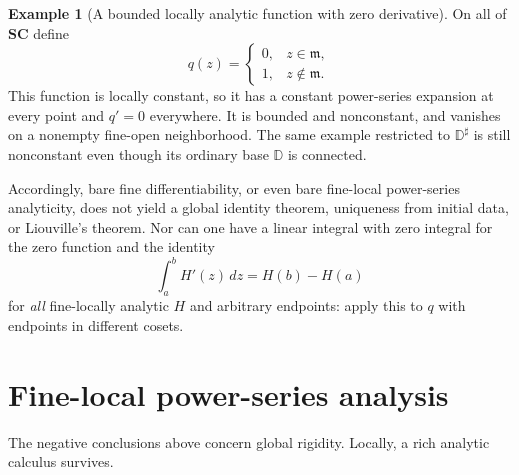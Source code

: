 \documentclass[11pt,letterpaper]{article}
\theoremstyle{definition}
\newtheorem{example}[theorem]{Example}
\theoremstyle{remark}
\newcommand{\SC}{\mathbf{SC}}
\newcommand{\mm}{\mathfrak m}
\newcommand{\DD}{\mathbb D}
\newcommand{\sh}{^{\sharp}}
\numberwithin{equation}{section}
\begin{document}
\begin{example}[A bounded locally analytic function with zero derivative]\label{ex:locconstant}
On all of $\SC$ define
\[
 q(z)=\begin{cases}0,&z\in\mm,\\1,&z\notin\mm.\end{cases}
\]
This function is locally constant, so it has a constant power-series expansion at every point and $q'=0$ everywhere. It is bounded and nonconstant, and vanishes on a nonempty fine-open neighborhood. The same example restricted to $\DD\sh$ is still nonconstant even though its ordinary base $\DD$ is connected.
\end{example}
Accordingly, bare fine differentiability, or even bare fine-local power-series analyticity, does not yield a global identity theorem, uniqueness from initial data, or Liouville's theorem. Nor can one have a linear integral with zero integral for the zero function and the identity
\[
 \int_a^b H'(z)\,dz=H(b)-H(a)
\]
for \emph{all} fine-locally analytic $H$ and arbitrary endpoints: apply this to $q$ with endpoints in different cosets.

\section{Fine-local power-series analysis}\label{sec:local}
The negative conclusions above concern global rigidity. Locally, a rich analytic calculus survives.
\end{document}
